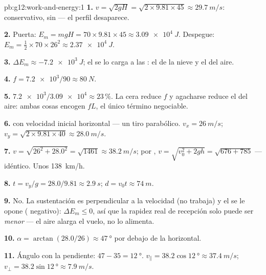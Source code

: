\begin{solution}{pb:g12:work-and-energy:1}
\textbf{1.} $v = \sqrt{2gH} = \sqrt{2 \times 9.81 \times 45} \approx
\qty{29.7}{m/s}$:  conservativo,  sin  --- el
perfil desaparece.

\textbf{2.} Puerta: $E_m = mgH = 70 \times 9.81 \times 45 \approx
\qty{3.09e4}{J}$. Despegue: $E_m = \tfrac12 \times 70 \times 26^2
\approx \qty{2.37e4}{J}$.

\textbf{3.} $\Delta E_m \approx \qty{-7.2e3}{J}$; el  se lo carga a las : el
 de la nieve y el del aire.

\textbf{4.} $f = \num{7.2e3}/90 \approx \qty{80}{N}$.

\textbf{5.} $\num{7.2e3}/\num{3.09e4} \approx 23\,\%$. La cera reduce
$f$ y agacharse reduce el  del aire: ambas cosas encogen $fL$,
el único término negociable.

\textbf{6.}  con velocidad inicial horizontal --- un tiro
parabólico. $v_x = \qty{26}{m/s}$;
$v_y = \sqrt{2 \times 9.81 \times 40} \approx \qty{28.0}{m/s}$.

\textbf{7.} $v = \sqrt{26^2 + 28.0^2} = \sqrt{1461} \approx
\qty{38.2}{m/s}$; por , $v = \sqrt{v_0^2 + 2gh} =
\sqrt{676 + 785}$ --- idéntico. Unos \qty{138}{km/h}.

\textbf{8.} $t = v_y/g = 28.0/9.81 \approx \qty{2.9}{s}$;
$d = v_0 t \approx \qty{74}{m}$.

\textbf{9.} No. La sustentación es perpendicular a la velocidad (no
trabaja) y el  se le opone ( negativo):
$\Delta E_m \leq 0$, así que la rapidez real de recepción solo puede ser
\emph{menor} --- el aire alarga el vuelo, no lo alimenta.

\textbf{10.} $\alpha = \arctan(28.0/26) \approx \qty{47}{\degree}$ por
debajo de la horizontal.

\textbf{11.} Ángulo con la pendiente: $47 - 35 = \qty{12}{\degree}$.
$v_\parallel = 38.2\cos\qty{12}{\degree} \approx \qty{37.4}{m/s}$;
$v_\perp = 38.2\sin\qty{12}{\degree} \approx \qty{7.9}{m/s}$.


\end{solution}
